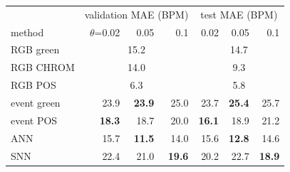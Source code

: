 \begin{tabular}{lrrrrrr}\toprule
 & \multicolumn{3}{c}{validation MAE (BPM)} & \multicolumn{3}{c}{test MAE (BPM)} \\
method & $\theta$=0.02 & 0.05 & 0.1 & 0.02 & 0.05 & 0.1 \\\midrule
RGB green & \multicolumn{3}{c}{15.2} & \multicolumn{3}{c}{14.7} \\
RGB CHROM & \multicolumn{3}{c}{14.0} & \multicolumn{3}{c}{9.3} \\
RGB POS & \multicolumn{3}{c}{6.3} & \multicolumn{3}{c}{5.8} \\
event green & 23.9 & \textbf{23.9} & 25.0 & 23.7 & \textbf{25.4} & 25.7 \\
event POS & \textbf{18.3} & 18.7 & 20.0 & \textbf{16.1} & 18.9 & 21.2 \\
ANN & 15.7 & \textbf{11.5} & 14.0 & 15.6 & \textbf{12.8} & 14.6 \\
SNN & 22.4 & 21.0 & \textbf{19.6} & 20.2 & 22.7 & \textbf{18.9} \\
\bottomrule\end{tabular}
